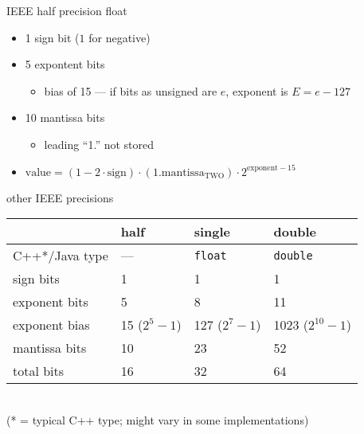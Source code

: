 \begin{frame}{IEEE half precision float}
\begin{itemize}
\item 1 sign bit ($1$ for negative)
\item 5 expontent bits
    \begin{itemize}
    \item bias of 15 --- if bits as unsigned are $e$, exponent is $E=e-127$
    \end{itemize}
\item 10 mantissa bits
    \begin{itemize}
    \item leading ``1.'' not stored
    \end{itemize}
\vspace{.5cm}
\item $\text{value} = (1-2\cdot \text{sign}) \cdot (1.\text{mantissa}_\text{TWO}) \cdot 2^{\text{exponent}-15}$
\end{itemize}
\end{frame}

\begin{frame}{other IEEE precisions}
\begin{tabular}{l|lll}
~ & half & single & double \\ \hline
C++*/Java type& --- & \texttt{float} & \texttt{double} \\
sign bits & 1 & 1 & 1 \\
exponent bits & 5 & 8 & 11 \\
    exponent bias & 15 {\small ($2^5-1$)} & 127 {\small ($2^7-1$)} & 1023 {\small ($2^{10}-1$)}\\
mantissa bits & 10 & 23 & 52 \\
total bits & 16 & 32 & 64 \\
\end{tabular}\\
    {\scriptsize (* = typical C++ type; might vary in some implementations)}
\end{frame}


